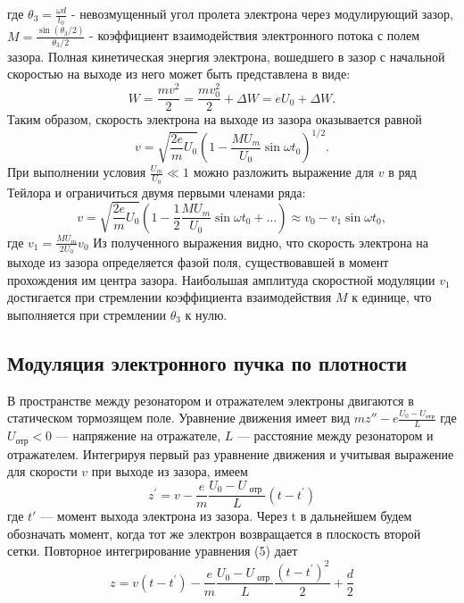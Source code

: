 где $\theta _ { 3 } = \frac { \omega d } { t _ { 0 } }$ - невозмущенный угол пролета электрона через модулирующий зазор, $M = \frac { \sin \left( \theta _ { 3 } / 2 \right) } { \theta _ { 3 } / 2 }$ - коэффициент взаимодействия электронного потока с полем зазора. Полная кинетическая энергия электрона, вошедшего в зазор с начальной скоростью на выходе из него может быть представлена в виде:
\begin{equation}
	W = \frac { m v ^ { 2 } } { 2 } = \frac { m v_0 ^ { 2 } } { 2 } + \Delta W = e U _ { 0 } + \Delta W.
\end{equation}
Таким образом, скорость электрона на выходе из зазора оказывается равной
\begin{equation}
	v = \sqrt { \frac { 2 e } { m } U _ { 0 } } \left( 1 - \frac { M U _ { m } } { U _ { 0 } } \sin \omega t _ { 0 } \right) ^ { 1 / 2 }.
\end{equation}
При выполнении условия $\frac { U _ { m } } { U _ { 0 } } \ll 1$ можно разложить выражение для $v$ в ряд Тейлора и ограничиться двумя первыми членами ряда:
\begin{equation}
	v = \sqrt { \frac { 2 e } { m } U _ { 0 } } \left( 1 - \frac { 1 } { 2 } \frac { M U _ { m } } { U _ { 0 } } \sin \omega t _ { 0 } + \ldots \right) \approx v _ { 0 } - v _ { 1 } \sin \omega t _ { 0 },
\end{equation} где $v _ { 1 } = \frac { M U _ { m } } { 2 U _ { 0 } } v _ { 0 }$
Из полученного выражения видно, что скорость электро­на на выходе из зазора определяется фазой поля, существовавшей в момент прохождения им центра зазора. Наибольшая амплитуда скоростной модуляции $v_1$ достигается при стремлении коэффициента взаимодействия $M$ к единице, что выполняется при стремлении $\theta_3$ к нулю.

\subsection{Модуляция электронного пучка по плотности}

В пространстве между резонатором и отражателем электроны двигаются в статическом тормозящем поле. Уравнение движения имеет вид 
$mz''- e \frac { U _ { 0 } - U _ { \text{отр} } } { L }$ где $U_{\text{отр}} < 0$ — напряжение на отражателе, $L$ — расстояние между резонатором и отражателем. Интегрируя первый раз уравнение движения и учитывая выражение для скорости $v$ при выходе из зазора, имеем
\begin{equation}
	z ^ { \prime } = v - \frac { e } { m } \frac { U _ { 0 } - U _ { \text { отр } } } { L } \left( t - t ^ { \prime } \right)
\end{equation}
где $t'$ — момент выхода электрона из зазора. Через t в дальнейшем будем обозначать момент, когда тот же электрон возвращается в плоскость второй сетки. Повторное интегрирование уравнения (5) дает
\begin{equation}
	z = v \left( t - t ^ { \prime } \right) - \frac { e } { m } \frac { U _ { 0 } - U _ { \text { отр } } } { L } \frac { \left( t - t ^ { \prime } \right) ^ { 2 } } { 2 } + \frac { d } { 2 }
\end{equation}

